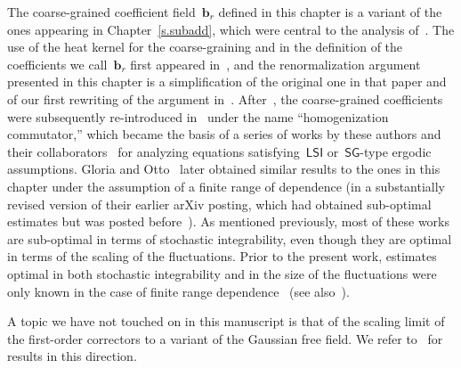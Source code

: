 \documentclass[11pt,twoside]{article} %
\numberwithin{equation}{section}
\theoremstyle{definition}
\renewcommand{\b}{\ensuremath{\mathbf{b}}}
\newcommand{\LSI}{\mathsf{LSI}}
\newcommand{\SG}{\mathsf{SG}}
\newcommand{\sectiontitle}{}
\newcommand{\subsectiontitle}{}
\begin{document}
The coarse-grained coefficient field~$\b_r$ defined in this chapter is a variant of the ones appearing in Chapter~\ref{s.subadd}, which were central to the analysis of~\cite{AS,AM,AKM1}. The use of the heat kernel for the coarse-graining and in the definition of the coefficients we call~$\b_r$ first appeared in~\cite{AKM}, and the renormalization argument presented in this chapter is a simplification of the original one in that paper and of our first rewriting of the argument in~\cite[Chapter 4]{AKMBook}.
After~\cite{AKM}, the coarse-grained coefficients were subsequently re-introduced in~\cite{DGO} under the name ``homogenization commutator,'' which became the basis of a series of works by these authors and their collaborators~\cite{DGO2,DFG} for analyzing equations satisfying~$\LSI$ or~$\SG$-type ergodic assumptions. Gloria and Otto~\cite{GO6} later obtained similar results to the ones in this chapter under the assumption of a finite range of dependence (in a substantially revised version of their earlier arXiv posting, which had obtained sub-optimal estimates but was posted before~\cite{AKM}). 
As mentioned previously, most of these works are sub-optimal in terms of stochastic integrability, even though they are optimal in terms of the scaling of the fluctuations. Prior to the present work, estimates optimal in both stochastic integrability and in the size of the fluctuations were only known in the case of finite range dependence~\cite{AKM,GO6} (see also~\cite{Fischer}). 

\smallskip

A topic we have not touched on in this manuscript is that of the scaling limit of the first-order correctors to a variant of the Gaussian free field. We refer to~\cite{AKM,DGO} for results in this direction. 


\renewcommand{\sectiontitle}{References}
\renewcommand{\subsectiontitle}{References}
{\small


}
\end{document}
